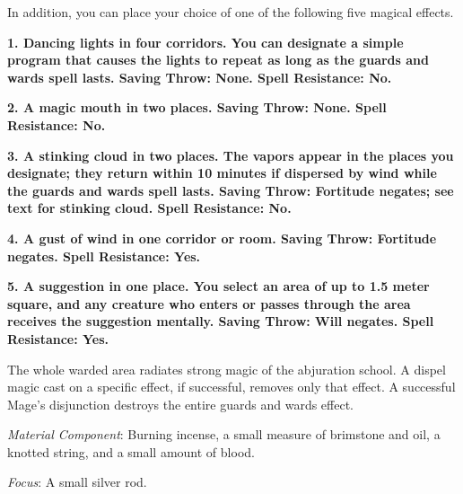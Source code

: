 {	In addition, you can place your choice of one of the following five magical effects.

	\textbf{	1. Dancing lights in four corridors. You can designate a simple program that causes the lights to repeat as long as the guards and wards spell lasts. Saving Throw: None. Spell Resistance: No.}

	\textbf{	2. A magic mouth in two places. Saving Throw: None. Spell Resistance: No.}

	\textbf{	3. A stinking cloud in two places. The vapors appear in the places you designate; they return within 10 minutes if dispersed by wind while the guards and wards spell lasts. Saving Throw: Fortitude negates; see text for stinking cloud. Spell Resistance: No.}

	\textbf{	4. A gust of wind in one corridor or room. Saving Throw: Fortitude negates. Spell Resistance: Yes.}

	\textbf{	5. A suggestion in one place. You select an area of up to 1.5 meter square, and any creature who enters or passes through the area receives the suggestion mentally. Saving Throw: Will negates. Spell Resistance: Yes.}

	The whole warded area radiates strong magic of the abjuration school. A dispel magic cast on a specific effect, if successful, removes only that effect. A successful Mage's disjunction destroys the entire guards and wards effect.

	\textit{Material Component}:
	Burning incense, a small measure of brimstone and oil, a knotted string, and a small amount of blood.

	\textit{Focus}:
	A small silver rod.

}
